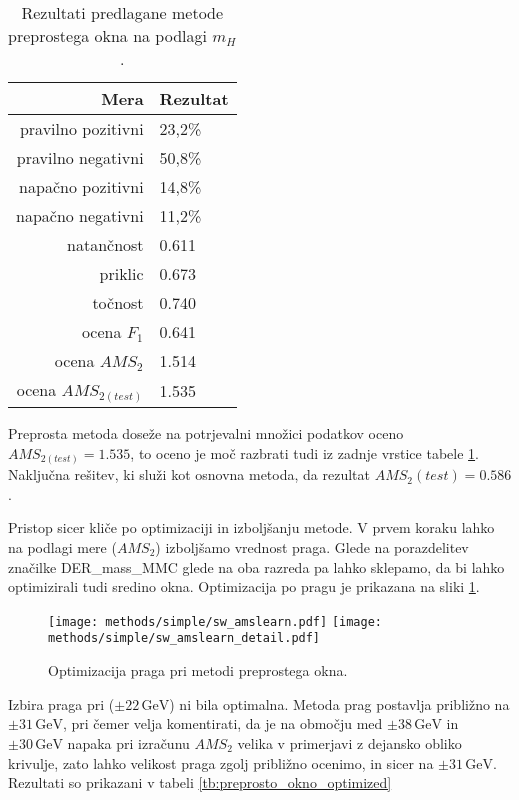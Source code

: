 \documentclass[11pt,a4paper,openany]{book}
\begin{document}
\begin{table}[ht]
	\centering
	\begin{tabular}{rl}
		\hline
		\textbf{Mera} & \textbf{Rezultat} \\
		\hline
		pravilno pozitivni & 23,2\%\\
		pravilno negativni & 50,8\% \\
		napačno pozitivni & 14,8\% \\
		napačno negativni & 11,2\% \\
		natančnost & 0.611 \\
		priklic & 0.673 \\
		točnost & 0.740 \\
		ocena $F_1$ & 0.641 \\
		ocena $AMS_2$ & 1.514 \\
		ocena $AMS_{2(test)}$ & 1.535 		
	\end{tabular}
	\caption{Rezultati predlagane metode preprostega okna na podlagi $m_H$.}
	\label{tb:preprosto_okno}
\end{table}

Preprosta metoda doseže na potrjevalni množici podatkov oceno $AMS_{2(test)} = 1.535$, to oceno je moč razbrati tudi iz zadnje vrstice tabele \ref{tb:preprosto_okno}. Naključna rešitev, ki služi kot osnovna metoda, da rezultat $AMS_2{(test)} = 0.586$.

Pristop sicer kliče po optimizaciji in izboljšanju metode. V prvem koraku lahko na podlagi mere ($AMS_2$) izboljšamo vrednost praga. Glede na porazdelitev značilke DER\_mass\_MMC glede na oba razreda pa lahko sklepamo, da bi lahko optimizirali tudi sredino okna. Optimizacija po pragu je prikazana na sliki \ref{sl:simple_optimization_threshold}.

\begin{figure}[h]
	\centering	
	\texttt{[image: methods/simple/sw\_amslearn.pdf]}
	\texttt{[image: methods/simple/sw\_amslearn\_detail.pdf]}		
	
	\caption{Optimizacija praga pri metodi preprostega okna.}
	\label{sl:simple_optimization_threshold}
\end{figure}

Izbira praga pri ($\pm 22\,\text{GeV}$) ni bila optimalna. Metoda prag postavlja približno na $\pm 31\,\text{GeV}$, pri čemer velja komentirati, da je na območju med $\pm 38\,\text{GeV}$ in $\pm 30\,\text{GeV}$ napaka pri izračunu $AMS_2$ velika v primerjavi z dejansko obliko krivulje, zato lahko velikost praga zgolj približno ocenimo, in sicer na $\pm 31\,\text{GeV}$. Rezultati so prikazani v tabeli \ref{tb:preprosto_okno_optimized}
\end{document}
